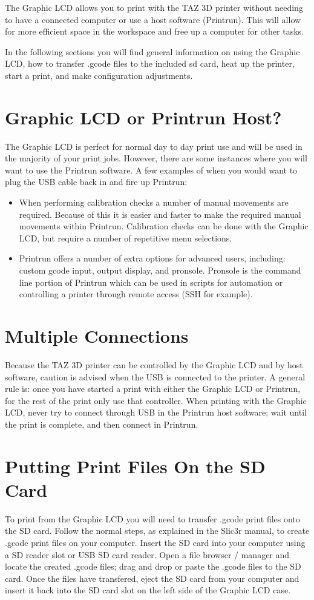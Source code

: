 
The Graphic LCD allows you to print with the TAZ 3D printer without needing to have a connected computer or use a host software (Printrun). This will allow for more efficient space in the workspace and free up a computer for other tasks.

In the following sections you will find general information on using the Graphic LCD, how to transfer .gcode files to the included sd card, heat up the printer, start a print, and make configuration adjustments.

\section{Graphic LCD or Printrun Host?}
The Graphic LCD is perfect for normal day to day print use and will be used in the majority of your print jobs. However, there are some instances where you will want to use the Printrun software. A few examples of when you would want to plug the USB cable back in and fire up Printrun:
\begin{itemize}
	\item When performing calibration checks a number of manual movements are required. Because of this it is easier and faster to make the required manual movements within Printrun. Calibration checks can be done with the Graphic LCD, but require a number of repetitive menu selections.
	\item Printrun offers a number of extra options for advanced users, including: custom gcode input, output display, and pronsole. Pronsole is the command line portion of Printrun which can be used in scripts for automation or controlling a printer through remote access (SSH for example).
\end{itemize}

\section{Multiple Connections}
Because the TAZ 3D printer can be controlled by the Graphic LCD and by host software, caution is advised when the USB is connected to the printer. A general rule is: once you have started a print with either the Graphic LCD or Printrun, for the rest of the print only use that controller. When printing with the Graphic LCD, never try to connect through USB in the Printrun host software; wait until the print is complete, and then connect in Printrun.

\section{Putting Print Files On the SD Card}
To print from the Graphic LCD you will need to transfer .gcode print files onto the SD card. Follow the normal steps, as explained in the Slic3r manual, to create .gcode print files on your computer. Insert the SD card into your computer using a SD reader slot or USB SD card reader. Open a file browser / manager and locate the created .gcode files; drag and drop or paste the .gcode files to the SD card. Once the files have transfered, eject the SD card from your computer and insert it back into the SD card slot on the left side of the Graphic LCD case.

